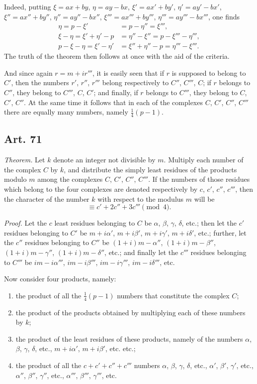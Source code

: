 \documentclass[12pt]{article}
\newcommand{\art}[1]{\subsection*{Art. #1}}
\begin{document}
Indeed, putting $\xi=ax+by$, $\eta=ay-bx$, $\xi'=ax'+by'$, $\eta'=ay'-bx'$, $\xi''=ax''+by''$, $\eta''=ay''-bx''$, $\xi'''=ax'''+by'''$, $\eta'''=ay'''-bx'''$, one finds
\[
\begin{aligned}
\eta=p-\xi'&=p-\eta''=\xi''',\\
\xi-\eta=\xi'+\eta'-p&=\eta''-\xi''=p-\xi'''-\eta''',\\
p-\xi-\eta=\xi'-\eta'&=\xi''+\eta''-p=\eta'''-\xi''' .
\end{aligned}
\]
The truth of the theorem then follows at once with the aid of the criteria.

And since again $r=m+ir'''$, it is easily seen that if $r$ is supposed to belong to $C'$, then the numbers $r'$, $r''$, $r'''$ belong respectively to $C''$, $C'''$, $C$; if $r$ belongs to $C''$, they belong to $C'''$, $C$, $C'$; and finally, if $r$ belongs to $C'''$, they belong to $C$, $C'$, $C''$. At the same time it follows that in each of the complexes $C$, $C'$, $C''$, $C'''$ there are equally many numbers, namely $\frac14(p-1)$.

\art{71}
\textit{Theorem.} Let $k$ denote an integer not divisible by $m$. Multiply each number of the complex $C$ by $k$, and distribute the simply least residues of the products modulo $m$ among the complexes $C$, $C'$, $C''$, $C'''$. If the numbers of those residues which belong to the four complexes are denoted respectively by $c$, $c'$, $c''$, $c'''$, then the character of the number $k$ with respect to the modulus $m$ will be
\[
\equiv c'+2c''+3c'''\pmod4.
\]

\textit{Proof.} Let the $c$ least residues belonging to $C$ be $\alpha$, $\beta$, $\gamma$, $\delta$, etc.; then let the $c'$ residues belonging to $C'$ be $m+i\alpha'$, $m+i\beta'$, $m+i\gamma'$, $m+i\delta'$, etc.; further, let the $c''$ residues belonging to $C''$ be $(1+i)m-\alpha''$, $(1+i)m-\beta''$, $(1+i)m-\gamma''$, $(1+i)m-\delta''$, etc.; and finally let the $c'''$ residues belonging to $C'''$ be $im-i\alpha'''$, $im-i\beta'''$, $im-i\gamma'''$, $im-i\delta'''$, etc.

Now consider four products, namely:

\begin{enumerate}[label=\arabic*.]
\item the product of all the $\frac14(p-1)$ numbers that constitute the complex $C$;
\item the product of the products obtained by multiplying each of these numbers by $k$;
\item the product of the least residues of these products, namely of the numbers $\alpha$, $\beta$, $\gamma$, $\delta$, etc., $m+i\alpha'$, $m+i\beta'$, etc. etc.;
\item the product of all the $c+c'+c''+c'''$ numbers $\alpha$, $\beta$, $\gamma$, $\delta$, etc., $\alpha'$, $\beta'$, $\gamma'$, etc., $\alpha''$, $\beta''$, $\gamma''$, etc., $\alpha'''$, $\beta'''$, $\gamma'''$, etc.
\end{enumerate}
\end{document}
